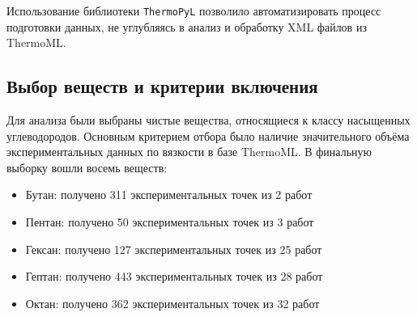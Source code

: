 \documentclass[a4paper,12pt]{article}
\begin{document}
      Использование библиотеки \texttt{ThermoPyL} позволило автоматизировать процесс подготовки данных, не углубляясь в анализ и обработку XML файлов из ThermoML.
    
  \subsection{Выбор веществ и критерии включения}
  
  Для анализа были выбраны чистые вещества, относящиеся к классу насыщенных углеводородов. Основным критерием отбора было наличие значительного объёма экспериментальных данных по вязкости в базе ThermoML. В финальную выборку вошли восемь веществ:
    \begin{itemize}
      \item Бутан: получено 311 экспериментальных точек из 2 работ \cite{acs.jced.5b00654,s10765-006-0053-2}
      \item Пентан: получено 50 экспериментальных точек из 3 работ \cite{acs.jced.7b00650,j.jct.2005.10.011,je0501944}
      \item Гексан: получено 127 экспериментальных точек из 25 работ \cite{acs.jced.5b00152,acs.jced.8b00589,j.fluid.2013.07.060,j.fluid.2018.08.001,j.jct.2004.09.021,j.jct.2005.03.024,j.jct.2005.07.008,j.jct.2005.10.011,j.jct.2007.05.016,j.jct.2008.02.005,j.tca.2005.10.008,je020114l,je020131a,je030107c,je034002l,je049576k,je049777o,je060389r,je060491o,je800048f,je8006138,je9006597,s10765-005-5572-8,s10765-006-0053-2,s10765-009-0622-2}
      \item Гептан: получено 443 экспериментальных точек из 28 работ \cite{acs.jced.5b00152,acs.jced.7b00121,j.fluid.2006.01.030,j.fluid.2010.10.009,j.fluid.2016.11.029,j.jct.2004.09.021,j.jct.2005.03.024,j.jct.2005.10.011,j.jct.2006.01.012,j.jct.2013.09.017,j.jct.2015.12.021,j.tca.2005.10.008,j.tca.2015.08.005,j.tca.2018.10.018,je020131a,je049662k,je049776w,je049777o,je400835u,je5007532,je600554h,je700202h,je8003707,je9006597,je900969u,s10765-009-0667-2,s10765-012-1373-z,s10765-014-1759-1}
      \item Октан: получено 362 экспериментальных точек из 32 работ \cite{acs.jced.6b00391,acs.jced.7b00121,acs.jced.7b00650,j.fluid.2010.10.009,j.jct.2003.12.005,j.jct.2004.09.021,j.jct.2005.03.024,j.jct.2005.10.011,j.jct.2006.01.012,j.jct.2007.05.016,j.jct.2008.02.005,j.jct.2013.09.017,j.jct.2014.09.015,j.tca.2005.10.008,j.tca.2015.08.005,je020131a,je034017j,je034208m,je049572f,je049776w,je0503296,je060389r,je300899n,je4004806,je400835u,je600554h,je800348s,je800417q,je9006597,s10765-006-0053-2,s10765-008-0542-6,s10765-014-1759-1}

\end{itemize}
\end{document}
